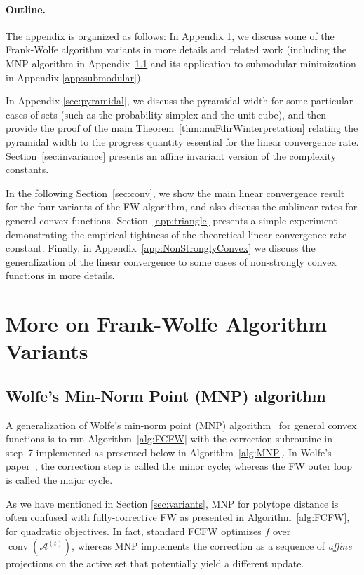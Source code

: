 \documentclass{article} %
\DeclareMathOperator*{\conv}{conv}
\newcommand{\Vertices}{\mathcal{A}} %
\newcommand{\0}{\mathbf{0}} %
\begin{document}
\paragraph{Outline.}
The appendix is organized as follows: In Appendix \ref{sec:FWvariants}, we discuss some of the Frank-Wolfe algorithm variants in more details and related work (including the MNP algorithm in Appendix~\ref{sec:MNPdetails} and its application to submodular minimization in Appendix \ref{app:submodular}).

In Appendix \ref{sec:pyramidal}, we discuss the pyramidal width for some particular cases of sets (such as the probability simplex and the unit cube), and then provide the proof of the main Theorem~\ref{thm:muFdirWinterpretation} relating the pyramidal width to the progress quantity essential for the linear convergence rate.
Section~\ref{sec:invariance} presents an affine invariant version of the complexity constants.

In the following Section~\ref{sec:conv}, we show the main linear convergence result for the four variants of the FW algorithm, and also discuss the sublinear rates for general convex functions.
Section~\ref{app:triangle} presents a simple experiment demonstrating the empirical tightness of the theoretical linear convergence rate constant.
Finally, in Appendix~\ref{app:NonStronglyConvex} we discuss the generalization of the linear convergence to some cases of non-strongly convex functions in more details.



%
\section{More on Frank-Wolfe Algorithm Variants}\label{sec:FWvariants}

\subsection{Wolfe's Min-Norm Point (MNP) algorithm}\label{sec:MNPdetails}

%
A generalization of Wolfe's min-norm point (MNP) algorithm~\citep{Wolfe:1976:MNP} for general convex functions is to 
run Algorithm~\ref{alg:FCFW} with the correction subroutine in step~7
implemented as presented below in Algorithm~\ref{alg:MNP}.
In Wolfe's paper~\citep{Wolfe:1976:MNP}, the correction step is called the minor cycle; whereas the FW outer loop is called the major cycle.

As we have mentioned in Section \ref{sec:variants}, MNP for polytope distance is often confused with fully-corrective FW as presented in Algorithm~\ref{alg:FCFW}, for quadratic
objectives. In fact, standard FCFW optimizes $f$ over
$\conv(\Vertices^{(t)})$, whereas MNP implements the correction as a
sequence of \emph{affine} projections on the active set that potentially yield a different update. 
\end{document}
